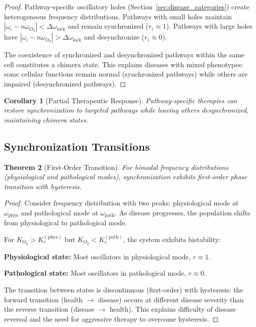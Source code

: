 \documentclass[11pt,twocolumn,a4paper]{article}
\newtheorem{theorem}{Theorem}[section]
\newtheorem{corollary}[theorem]{Corollary}
\theoremstyle{definition}
\theoremstyle{remark}
\newcommand{\omegalock}{\Delta\omega_{\mathrm{lock}}}
\begin{document}
\begin{proof}
Pathway-specific oscillatory holes (Section~\ref{sec:disease_categories}) create heterogeneous frequency distributions. Pathways with small holes maintain $|\omega_i - n\omega_{\mathrm{O_2}}| < \omegalock$ and remain synchronized ($r_i \approx 1$). Pathways with large holes have $|\omega_i - n\omega_{\mathrm{O_2}}| > \omegalock$ and desynchronize ($r_i \approx 0$).

The coexistence of synchronized and desynchronized pathways within the same cell constitutes a chimera state. This explains diseases with mixed phenotypes: some cellular functions remain normal (synchronized pathways) while others are impaired (desynchronized pathways).
\end{proof}

\begin{corollary}[Partial Therapeutic Response]
\label{cor:partial_response}
Pathway-specific therapies can restore synchronization to targeted pathways while leaving others desynchronized, maintaining chimera states.
\end{corollary}

\subsection{Synchronization Transitions}

\begin{theorem}[First-Order Transition]
\label{thm:first_order_transition}
For bimodal frequency distributions (physiological and pathological modes), synchronization exhibits first-order phase transition with hysteresis.
\end{theorem}

\begin{proof}
Consider frequency distribution with two peaks: physiological mode at $\omega_{\mathrm{phys}}$ and pathological mode at $\omega_{\mathrm{path}}$. As disease progresses, the population shifts from physiological to pathological mode.

For $K_{\mathrm{O_2}} > K_c^{\mathrm{(phys)}}$ but $K_{\mathrm{O_2}} < K_c^{\mathrm{(path)}}$, the system exhibits bistability:

\textbf{Physiological state:} Most oscillators in physiological mode, $r \approx 1$.

\textbf{Pathological state:} Most oscillators in pathological mode, $r \approx 0$.

The transition between states is discontinuous (first-order) with hysteresis: the forward transition (health $\to$ disease) occurs at different disease severity than the reverse transition (disease $\to$ health). This explains difficulty of disease reversal and the need for aggressive therapy to overcome hysteresis.
\end{proof}
\end{document}
